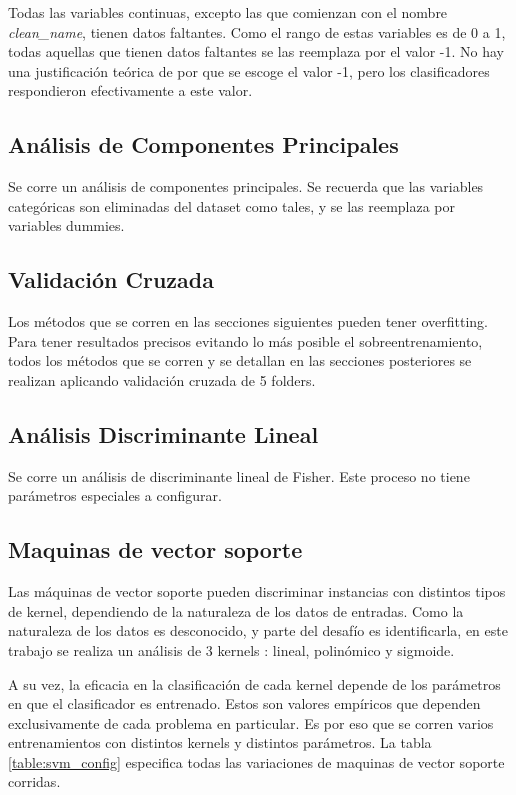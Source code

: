 \documentclass[journal]{IEEEtran}
\begin{document}
Todas las variables continuas, excepto las que comienzan con el
nombre \textit{clean\_name}, tienen datos faltantes. Como el rango
de estas variables es de 0 a 1, todas aquellas que tienen datos
faltantes se las reemplaza por el valor -1. No hay una justificación
teórica de por que se escoge el valor -1, pero los clasificadores
respondieron efectivamente a este valor.

\subsection{Análisis de Componentes Principales}
Se corre un análisis de componentes principales. Se recuerda que las 
variables categóricas son eliminadas del dataset como tales, y se las
reemplaza por variables dummies.

\subsection{Validación Cruzada}
Los métodos que se corren en las secciones siguientes pueden tener overfitting. Para
tener resultados precisos evitando lo más posible el sobreentrenamiento, todos los
métodos que se corren y se detallan en las secciones posteriores se realizan
aplicando validación cruzada de 5 folders.

\subsection{Análisis Discriminante Lineal}
Se corre un análisis de discriminante lineal de Fisher. Este proceso no 
tiene parámetros especiales a configurar.

\subsection{Maquinas de vector soporte}
Las máquinas de vector soporte pueden discriminar instancias con distintos
tipos de kernel, dependiendo de la naturaleza de los datos de entradas. Como
la naturaleza de los datos es desconocido, y parte del desafío es identificarla,
en este trabajo se realiza un análisis de 3 kernels : lineal,
polinómico y sigmoide.

A su vez, la eficacia en la clasificación de cada kernel depende de los
parámetros en que el clasificador es entrenado. Estos son valores empíricos
que dependen exclusivamente de cada problema en particular. Es por eso
que se corren varios entrenamientos con distintos kernels y distintos parámetros.
La tabla \ref{table:svm_config} especifica todas las variaciones de maquinas 
de vector soporte corridas.
\end{document}
